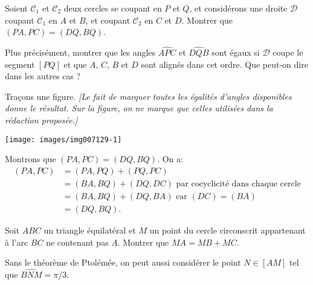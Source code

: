 \begin{exo} %


Soient $\mathcal C_1$ et $\mathcal C_2$ deux cercles se coupant en $P$ et $Q$, et considérons une droite $\mathcal D$ coupant $\mathcal C_1$ en $A$ et $B$, et coupant $\mathcal C_2$ en  $C$ et $D$. Montrer que $(PA,PC)=(DQ,BQ)$.


Plus précisément, montrer que les angles $\widehat{APC}$ et $\widehat{DQB}$ sont égaux si $\mathcal D$ coupe le segment $[PQ]$ et que $A$, $C$, $B$ et $D$ sont alignés dans cet ordre. Que peut-on dire dans les autres cas ?


\begin{sol}  Traçons une figure. \emph{[Le fait de marquer toutes les égalités d'angles disponibles donne le résultat. Sur la figure, on ne marque que celles utilisées dans la rédaction proposée.]}
\begin{center}
\texttt{[image: images/img007129-1]}
\end{center}

Montrons que $(PA,PC)=(DQ,BQ)$. On a:
\begin{align*}
(PA,PC)&= (PA,PQ)+(PQ,PC) \\
&= (BA,BQ)+(DQ,DC) \text{ par cocyclicité dans chaque cercle}\\
&= (BA,BQ)+(DQ,BA) \text{ car $(DC)=(BA)$}\\
&= (DQ,BQ).
\end{align*}

\end{sol}  
\end{exo}  








\begin{exo}%
Soit $ABC$ un triangle équilatéral et $M$ un point du cercle circonscrit appartenant à l'arc $BC$ ne contenant pas $A$. Montrer que $MA= MB+MC$.

\begin{hint}Sans le théorème de Ptolémée, on peut aussi considérer le point $N \in [AM]$ tel que $\widehat{BNM}=\pi/3$.
\end{hint}
\end{exo}  


